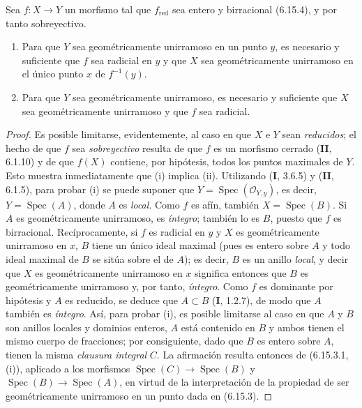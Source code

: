 \begin{proposition}[6.15.5]
\label{IV.2.s6.15.5-fr}
Sea $f:X\to Y$ un morfismo tal que $f_{\mathrm{red}}$ sea
entero y birracional \textup{(6.15.4)}, y por tanto sobreyectivo.
\begin{enumerate}
\item[\textup{(i)}] Para que $Y$ sea geométricamente unirramoso en un
punto $y$, es necesario y suficiente que $f$ sea radicial en
$y$ y que $X$ sea geométricamente unirramoso en el único
punto $x$ de $f^{-1}(y)$.
\item[\textup{(ii)}] Para que $Y$ sea geométricamente unirramoso, es
necesario y suficiente que $X$ sea geométricamente unirramoso
y que $f$ sea radicial.
\end{enumerate}
\end{proposition}

\begin{proof}
Es posible limitarse, evidentemente, al caso en que $X$ e $Y$
sean \emph{reducidos}; el hecho de que $f$ sea \emph{sobreyectivo} resulta de que $f$
es un morfismo cerrado (\textbf{II}, 6.1.10) y de que $f(X)$ contiene,
por hipótesis, todos los puntos maximales de $Y$. Esto muestra
inmediatamente que (i) implica (ii). Utilizando (\textbf I, 3.6.5)
y (\textbf{II}, 6.1.5), para probar (i) se puede suponer que
$Y=\operatorname{Spec}(\mathcal O_{Y,y})$,
es decir, $Y=\operatorname{Spec}(A)$, donde $A$ es \emph{local}. Como $f$ es
afín, también $X=\operatorname{Spec}(B)$. Si $A$ es
geométricamente unirramoso, es \emph{íntegro}; también lo
es $B$, puesto que $f$ es birracional. Recíprocamente, si $f$
es radicial en $y$ y $X$ es geométricamente unirramoso en $x$,
$B$ tiene un único ideal maximal (pues es entero sobre $A$ y
todo ideal maximal de $B$ se sitúa sobre el de $A$); es decir,
$B$ es un anillo \emph{local}, y decir que $X$ es geométricamente
unirramoso en $x$ significa entonces que $B$ es
geométricamente unirramoso y, por tanto, \emph{íntegro}. Como $f$ es
dominante por hipótesis y $A$ es reducido, se deduce que
$A\subset B$ (\textbf{I}, 1.2.7), de modo que $A$ también es \emph{íntegro}. Así, para probar (i), es posible limitarse
al caso en que $A$ y $B$ son anillos locales y dominios enteros,
$A$ está contenido en $B$ y ambos tienen el mismo cuerpo de
fracciones; por consiguiente, dado que $B$ es entero sobre
$A$, tienen la misma \emph{clausura integral} $C$. La afirmación
resulta entonces de (6.15.3.1, (i)), aplicado a los morfismos
$\operatorname{Spec}(C)\to\operatorname{Spec}(B)$ y
$\operatorname{Spec}(B)\to\operatorname{Spec}(A)$, en virtud de
la interpretación de la propiedad de ser geométricamente
unirramoso en un punto dada en (6.15.3).
\end{proof}
